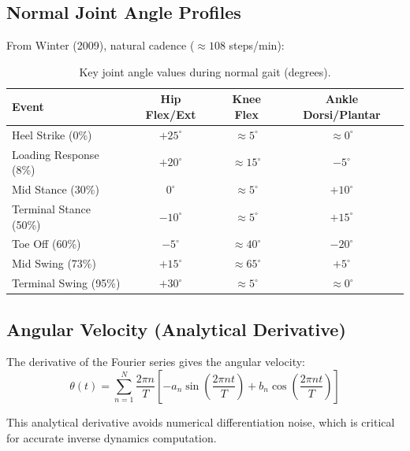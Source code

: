 \documentclass[11pt,a4paper]{article}
\newcommand{\dt}[1]{\dot{#1}}
\def\dt#1{#1}%
\begin{document}
\subsection{Normal Joint Angle Profiles}

From Winter (2009), natural cadence ($\approx 108$ steps/min):

\begin{table}[H]
\centering
\caption{Key joint angle values during normal gait (degrees).}
\label{tab:normal_angles}
\begin{tabular}{@{}lccc@{}}
\toprule
\textbf{Event} & \textbf{Hip Flex/Ext} & \textbf{Knee Flex} & \textbf{Ankle Dorsi/Plantar} \\
\midrule
Heel Strike (0\%)    & $+25^\circ$ & $\approx 5^\circ$ & $\approx 0^\circ$ \\
Loading Response (8\%) & $+20^\circ$ & $\approx 15^\circ$ & $-5^\circ$ \\
Mid Stance (30\%)     & $0^\circ$   & $\approx 5^\circ$  & $+10^\circ$ \\
Terminal Stance (50\%) & $-10^\circ$ & $\approx 5^\circ$  & $+15^\circ$ \\
Toe Off (60\%)         & $-5^\circ$  & $\approx 40^\circ$ & $-20^\circ$ \\
Mid Swing (73\%)       & $+15^\circ$ & $\approx 65^\circ$ & $+5^\circ$ \\
Terminal Swing (95\%)  & $+30^\circ$ & $\approx 5^\circ$  & $\approx 0^\circ$ \\
\bottomrule
\end{tabular}
\end{table}

\subsection{Angular Velocity (Analytical Derivative)}

The derivative of the Fourier series gives the angular velocity:
\begin{equation}
    \dt{\theta}(t) = \sum_{n=1}^{N} \frac{2\pi n}{T} \left[
        -a_n \sin\left(\frac{2\pi n t}{T}\right) + b_n \cos\left(\frac{2\pi n t}{T}\right)
    \right]
    \label{eq:fourier_velocity}
\end{equation}

This analytical derivative avoids numerical differentiation noise, which is
critical for accurate inverse dynamics computation.

\end{document}
